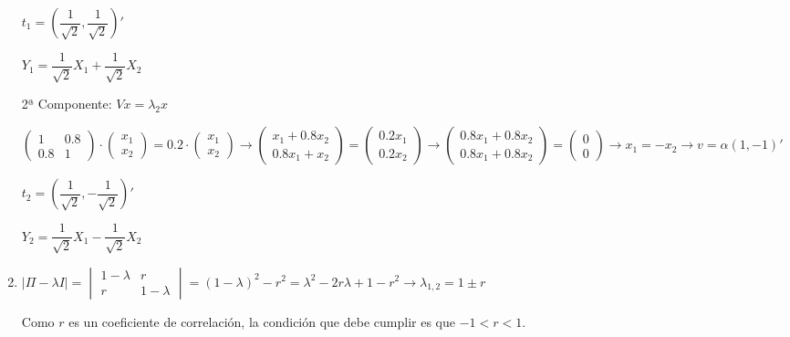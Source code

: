 \begin{enumerate}[label=\color{red}\textbf{\arabic*)}, leftmargin=*]
$t_1=\left(\dfrac{1}{\sqrt{2}},\dfrac{1}{\sqrt{2}}\right)'$
	
	$Y_1=\dfrac{1}{\sqrt{2}}X_1+\dfrac{1}{\sqrt{2}}X_2$
	
2ª Componente: $Vx=\lambda_2x$

$\begin{pmatrix}
	1 & 0.8\\
	0.8 & 1
\end{pmatrix}\cdot\begin{pmatrix}
x_1\\
x_2
\end{pmatrix}=0.2\cdot\begin{pmatrix}
x_1\\
x_2
\end{pmatrix}\longrightarrow\begin{pmatrix}
x_1+0.8x_2\\
0.8x_1+x_2
\end{pmatrix}=\begin{pmatrix}
0.2x_1\\
0.2x_2
\end{pmatrix}\longrightarrow\begin{pmatrix}
0.8x_1+0.8x_2\\
0.8x_1+0.8x_2
\end{pmatrix}=\begin{pmatrix}
0\\
0
\end{pmatrix}\longrightarrow x_1=-x_2\longrightarrow v=\alpha(1,-1)'$

$t_2=\left(\dfrac{1}{\sqrt{2}},-\dfrac{1}{\sqrt{2}}\right)'$
	
	$Y_2=\dfrac{1}{\sqrt{2}}X_1-\dfrac{1}{\sqrt{2}}X_2$
	\item {}
	
	$\left|\Pi-\lambda I\right|=\begin{vmatrix}
		1-\lambda & r\\
		r & 1-\lambda
	\end{vmatrix}=(1-\lambda)^2-r^2=\lambda^2-2r\lambda+1-r^2\longrightarrow \lambda_{1,2}=1\pm r$
	
	Como $r$ es un coeficiente de correlación, la condición que debe cumplir es que $-1<r<1$.
	

\end{enumerate}

